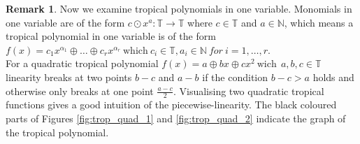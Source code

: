 \documentclass{article}
\theoremstyle{definition}
\newtheorem{remark}[theorem]{Remark}
\begin{document}
\begin{remark}
Now we examine tropical polynomials in one variable. Monomials in one variable are of the form $ c \odot x^{a}: \mathbb{T} \to \mathbb{T}$ where $c \in \mathbb{T}$ and $ a \in \mathbb{N} $, which means a tropical polynomial in one variable is of the form $f(x)=c_1x^{\alpha_1} \oplus \dots \oplus c_rx^{\alpha_r} \ \text{which} \ c_i \in \mathbb{T}, a_i \in \mathbb{N} \ for \ i=1, \dots , r$. \\
For a quadratic tropical polynomial $f(x) = a \oplus bx \oplus cx^{2} \ \text{wich} \ \ a,b,c \in \mathbb{T}$ linearity breaks at two points $b-c$ and $a-b$ if the condition $b-c > a$ holds and otherwise only breaks at one point $\frac{a-c}{2}$. Visualising two quadratic tropical functions gives a good intuition of the piecewise-linearity. The black coloured parts of Figures \ref{fig:trop_quad_1} and \ref{fig:trop_quad_2} indicate the graph of the tropical polynomial.

\begin{figure}[h]


\end{figure}
\end{remark}
\end{document}
